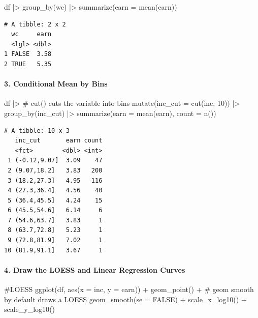 \documentclass[
  letterpaper,
  DIV=11,
  numbers=noendperiod]{scrartcl}
\let\oldparagraph\paragraph
\renewcommand{\paragraph}[1]{\oldparagraph{#1}\mbox{}}
\newenvironment{Shaded}{\begin{snugshade}}{\end{snugshade}}
\newcommand{\AttributeTok}[1]{\textcolor[rgb]{0.40,0.45,0.13}{#1}}
\newcommand{\CommentTok}[1]{\textcolor[rgb]{0.37,0.37,0.37}{#1}}
\newcommand{\ConstantTok}[1]{\textcolor[rgb]{0.56,0.35,0.01}{#1}}
\newcommand{\DecValTok}[1]{\textcolor[rgb]{0.68,0.00,0.00}{#1}}
\newcommand{\FunctionTok}[1]{\textcolor[rgb]{0.28,0.35,0.67}{#1}}
\newcommand{\NormalTok}[1]{\textcolor[rgb]{0.00,0.23,0.31}{#1}}
\newcommand{\SpecialCharTok}[1]{\textcolor[rgb]{0.37,0.37,0.37}{#1}}
\begin{document}
\begin{Shaded}
\begin{Highlighting}[]
\NormalTok{df }\SpecialCharTok{|\textgreater{}}
  \FunctionTok{group\_by}\NormalTok{(wc) }\SpecialCharTok{|\textgreater{}}
  \FunctionTok{summarize}\NormalTok{(}\AttributeTok{earn =} \FunctionTok{mean}\NormalTok{(earn))}
\end{Highlighting}
\end{Shaded}

\begin{verbatim}
# A tibble: 2 x 2
  wc     earn
  <lgl> <dbl>
1 FALSE  3.58
2 TRUE   5.35
\end{verbatim}

\paragraph{3. Conditional Mean by Bins}\label{conditional-mean-by-bins}

\begin{Shaded}
\begin{Highlighting}[]
\NormalTok{df }\SpecialCharTok{|\textgreater{}}
  \CommentTok{\# cut() cuts the variable into bins}
  \FunctionTok{mutate}\NormalTok{(}\AttributeTok{inc\_cut =} \FunctionTok{cut}\NormalTok{(inc, }\DecValTok{10}\NormalTok{)) }\SpecialCharTok{|\textgreater{}}
  \FunctionTok{group\_by}\NormalTok{(inc\_cut) }\SpecialCharTok{|\textgreater{}}
  \FunctionTok{summarize}\NormalTok{(}\AttributeTok{earn =} \FunctionTok{mean}\NormalTok{(earn),}
            \AttributeTok{count =} \FunctionTok{n}\NormalTok{())}
\end{Highlighting}
\end{Shaded}

\begin{verbatim}
# A tibble: 10 x 3
   inc_cut       earn count
   <fct>        <dbl> <int>
 1 (-0.12,9.07]  3.09    47
 2 (9.07,18.2]   3.83   200
 3 (18.2,27.3]   4.95   116
 4 (27.3,36.4]   4.56    40
 5 (36.4,45.5]   4.24    15
 6 (45.5,54.6]   6.14     6
 7 (54.6,63.7]   3.83     1
 8 (63.7,72.8]   5.23     1
 9 (72.8,81.9]   7.02     1
10 (81.9,91.1]   3.67     1
\end{verbatim}

\paragraph{4. Draw the LOESS and Linear Regression
Curves}\label{draw-the-loess-and-linear-regression-curves}

\begin{Shaded}
\begin{Highlighting}[]
\CommentTok{\#LOESS}
\FunctionTok{ggplot}\NormalTok{(df, }\FunctionTok{aes}\NormalTok{(}\AttributeTok{x =}\NormalTok{ inc, }\AttributeTok{y =}\NormalTok{ earn)) }\SpecialCharTok{+}
  \FunctionTok{geom\_point}\NormalTok{() }\SpecialCharTok{+}
  \CommentTok{\# geom smooth by default draws a LOESS}
  \FunctionTok{geom\_smooth}\NormalTok{(}\AttributeTok{se =} \ConstantTok{FALSE}\NormalTok{) }\SpecialCharTok{+}
  \FunctionTok{scale\_x\_log10}\NormalTok{() }\SpecialCharTok{+} \FunctionTok{scale\_y\_log10}\NormalTok{()}
\end{Highlighting}
\end{Shaded}
\end{document}

